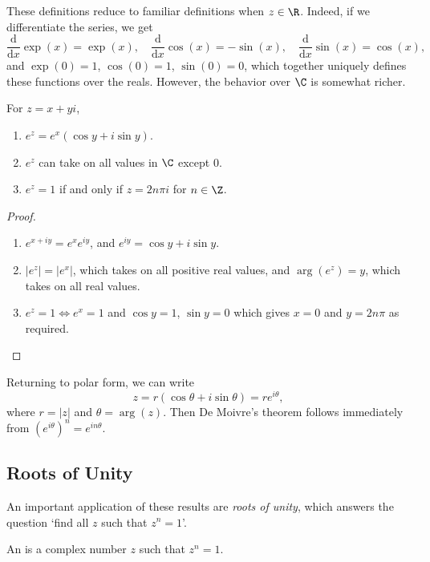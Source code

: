 These definitions reduce to familiar definitions when $z \in \R$. Indeed, if we differentiate the series, we get
$$
	\frac{\mathrm{d}}{\mathrm{d}x} \exp(x) = \exp(x), \quad
	\frac{\mathrm{d}}{\mathrm{d}x}\cos(x) = -\sin(x), \quad
	\frac{\mathrm{d}}{\mathrm{d}x} \sin(x) = \cos(x),
$$
and $\exp(0) = 1$, $\cos(0) = 1$, $\sin(0) = 0$, which together uniquely defines these functions over the reals. However, the behavior over $\C$ is somewhat richer.

\begin{proposition}
	For $z = x + yi$,
	\begin{enumerate}[label=(\roman*)]
		\item $e^z = e^x(\cos y + i \sin y)$.
		\item $e^z$ can take on all values in $\C$ except 0.
		\item $e^z = 1$ if and only if $z = 2 n \pi i$ for $n \in \Z$. 
	\end{enumerate}
\end{proposition}
\begin{proof}\begin{enumerate}[label=(\roman*)]
	\item $e^{x + iy} = e^x e^{iy}$, and $e^{iy} = \cos y + i \sin y$.
	\item $|e^z| = |e^x|$, which takes on all positive real values, and $\arg(e^z) = y$, which takes on all real values.
	\item $e^z = 1 \iff e^x = 1$ and $\cos y = 1$, $\sin y = 0$ which gives $x = 0$ and $y = 2 n \pi$ as required. \qedhere
\end{enumerate}
\end{proof}

Returning to polar form, we can write
$$
z = r(\cos \theta + i \sin \theta) = re^{i \theta},
$$
where $r = |z|$ and $\theta = \arg(z)$. 
Then De Moivre's theorem follows immediately from $(e^{i \theta})^n = e^{i n \theta}$.


\subsection{Roots of Unity}

An important application of these results are \emph{roots of unity}, which answers the question `find all $z$ such that $z^n = 1$'.

\begin{definition}
	An  is a complex number $z$ such that $z^n = 1$.
\end{definition}

